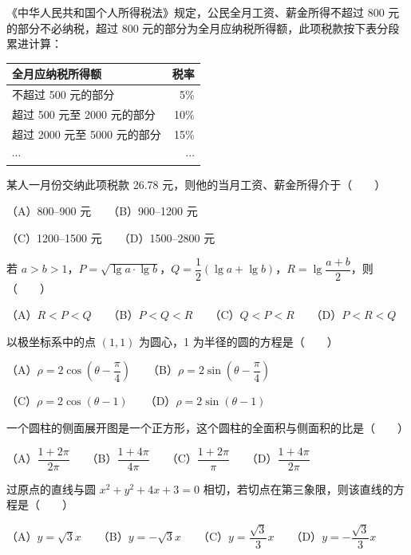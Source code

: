 \begin{question}
《中华人民共和国个人所得税法》规定，公民全月工资、薪金所得不超过 800 元的部分不必纳税，超过 800 元的部分为全月应纳税所得额，此项税款按下表分段累进计算：

\begin{center}
\begin{tabular}{lr}
\toprule
全月应纳税所得额 & 税率 \\
\midrule
不超过 500 元的部分 & 5\% \\
超过 500 元至 2000 元的部分 & 10\% \\
超过 2000 元至 5000 元的部分 & 15\% \\
$\cdots$ & $\cdots$ \\
\bottomrule
\end{tabular}
\end{center}

某人一月份交纳此项税款 26.78 元，则他的当月工资、薪金所得介于\mbox{（　　）}

（A）800–900 元　　（B）900–1200 元

（C）1200–1500 元　　（D）1500–2800 元

\end{question}
\begin{question}
若 $a>b>1$，$P=\sqrt{\lg a\cdot\lg b}$，$Q=\dfrac12(\lg a+\lg b)$，$R=\lg\dfrac{a+b}{2}$，则\mbox{（　　）}

（A）$R<P<Q$　　（B）$P<Q<R$　　（C）$Q<P<R$　　（D）$P<R<Q$

\end{question}
\begin{question}
以极坐标系中的点 $(1,1)$ 为圆心，1 为半径的圆的方程是\mbox{（　　）}

（A）$\rho=2\cos\left(\theta-\dfrac\pi4\right)$　　（B）$\rho=2\sin\left(\theta-\dfrac\pi4\right)$

（C）$\rho=2\cos(\theta-1)$　　（D）$\rho=2\sin(\theta-1)$

\end{question}
\begin{question}
一个圆柱的侧面展开图是一个正方形，这个圆柱的全面积与侧面积的比是\mbox{（　　）}

（A）$\dfrac{1+2\pi}{2\pi}$　　（B）$\dfrac{1+4\pi}{4\pi}$　　（C）$\dfrac{1+2\pi}{\pi}$　　（D）$\dfrac{1+4\pi}{2\pi}$

\end{question}
\begin{question}
过原点的直线与圆 $x^2+y^2+4x+3=0$ 相切，若切点在第三象限，则该直线的方程是\mbox{（　　）}

（A）$y=\sqrt3x$　　（B）$y=-\sqrt3x$　　（C）$y=\dfrac{\sqrt3}{3}x$　　（D）$y=-\dfrac{\sqrt3}{3}x$

\end{question}
